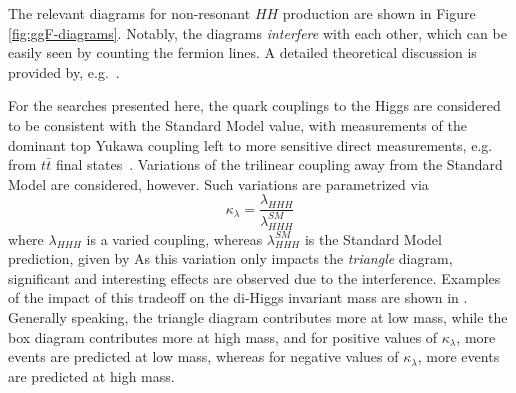 The relevant diagrams for non-resonant $HH$ production are shown in Figure \ref{fig:ggF-diagrams}.
Notably, the diagrams \emph{interfere} with each other, which can be easily seen by counting the fermion lines. 
A detailed theoretical discussion is provided by, e.g.~\cite{Dawson-2015}.

For the searches presented here, the quark couplings to the Higgs are considered to be consistent with the Standard 
Model value, with measurements of the dominant top Yukawa coupling left to more sensitive direct measurements, e.g. from 
$t\bar{t}$ final states~\cite{top-Yukawa}. Variations of the trilinear coupling away from the Standard 
Model are considered, however. Such variations are parametrized via 
\begin{equation}
\kappa_{\lambda} = \frac{\lambda_{HHH}}{\lambda_{HHH}^{SM}}
\end{equation}
where $\lambda_{HHH}$ is a varied coupling, whereas $\lambda_{HHH}^{SM}$ is the Standard Model prediction, given by
As this variation only impacts the \emph{triangle} diagram, significant and interesting effects are observed due to the interference. Examples of the impact of this tradeoff on the di-Higgs invariant mass are shown in . Generally speaking, the triangle diagram contributes more at low mass, while the box diagram contributes more at high mass, and for positive values of $\kappa_{\lambda}$, more events are predicted at low mass, whereas for negative values of $\kappa_{\lambda}$, more events are predicted at high mass.
